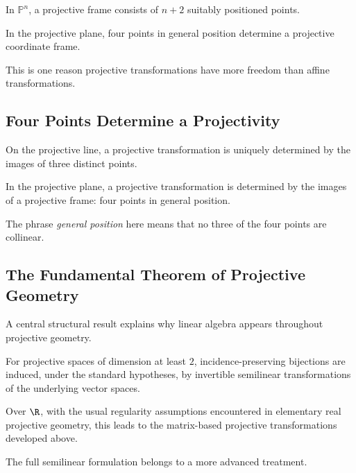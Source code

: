 In \(\mathbb{P}^{n}\), a projective frame consists of \(n+2\) suitably
positioned points.

In the projective plane, four points in general position determine a
projective coordinate frame.

This is one reason projective transformations have more freedom than affine
transformations.

\subsection{Four Points Determine a Projectivity}
\label{subsec:four-points-projectivity}

On the projective line, a projective transformation is uniquely determined
by the images of three distinct points.

In the projective plane, a projective transformation is determined by the
images of a projective frame: four points in general position.

The phrase \emph{general position} here means that no three of the four
points are collinear.

\subsection{The Fundamental Theorem of Projective Geometry}
\label{subsec:fundamental-theorem-projective-geometry}

A central structural result explains why linear algebra appears throughout
projective geometry.

\begin{theorem}
For projective spaces of dimension at least \(2\), incidence-preserving
bijections are induced, under the standard hypotheses, by invertible
semilinear transformations of the underlying vector spaces.
\end{theorem}

Over \(\R\), with the usual regularity assumptions encountered in elementary
real projective geometry, this leads to the matrix-based projective
transformations developed above.

The full semilinear formulation belongs to a more advanced treatment.


